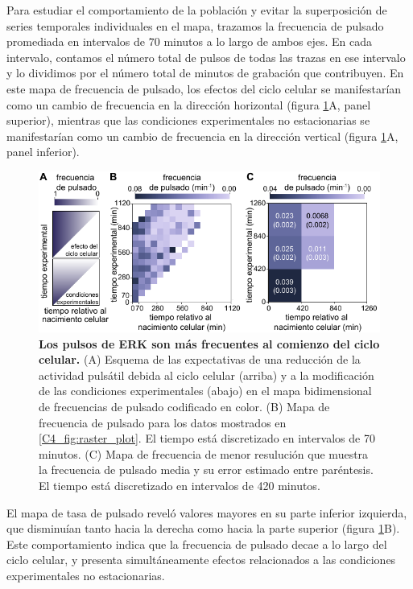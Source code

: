 \documentclass[./main.tex]{subfiles}
\begin{document}
Para estudiar el comportamiento de la población y evitar la superposición de series temporales individuales en el mapa, trazamos la frecuencia de pulsado promediada en intervalos de $70$ minutos a lo largo de ambos ejes. En cada intervalo, contamos el número total de pulsos de todas las trazas en ese intervalo y lo dividimos por el número total de minutos de grabación que contribuyen. En este mapa de frecuencia de pulsado, los efectos del ciclo celular se manifestarían como un cambio de frecuencia en la dirección horizontal (figura \ref{C4_fig:cell_cycle_effect}A, panel superior), mientras que las condiciones experimentales no estacionarias se manifestarían como un cambio de frecuencia en la dirección vertical (figura \ref{C4_fig:cell_cycle_effect}A, panel inferior).

\begin{figure}
    \centering
    \includegraphics[width=1\columnwidth]{figures/chapter4/C4_cell_cycle.pdf}\caption{\textbf{Los pulsos de ERK son más frecuentes al comienzo del ciclo celular.} (A) Esquema de las expectativas de una reducción de la actividad pulsátil debida al ciclo celular (arriba) y a la modificación de las condiciones experimentales (abajo) en el mapa bidimensional de frecuencias de pulsado codificado en color. (B) Mapa de frecuencia de pulsado para los datos mostrados en \ref{C4_fig:raster_plot}. El tiempo está discretizado en intervalos de 70 minutos. (C) Mapa de frecuencia de menor resulución que muestra la frecuencia de pulsado media y su error estimado entre paréntesis. El tiempo está discretizado en intervalos de 420 minutos.}
    \label{C4_fig:cell_cycle_effect}
\end{figure}


El mapa de tasa de pulsado reveló valores mayores en su parte inferior izquierda, que disminuían tanto hacia la derecha como hacia la parte superior (figura \ref{C4_fig:cell_cycle_effect}B). Este comportamiento indica que la frecuencia de pulsado decae a lo largo del ciclo celular, y presenta simultáneamente efectos relacionados a las condiciones experimentales no estacionarias. 
\end{document}
